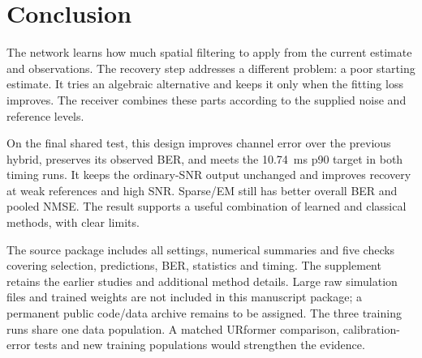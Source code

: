 \section{Conclusion}
The network learns how much spatial filtering to apply from the current estimate and observations. The recovery step addresses a different problem: a poor starting estimate. It tries an algebraic alternative and keeps it only when the fitting loss improves. The receiver combines these parts according to the supplied noise and reference levels.

On the final shared test, this design improves channel error over the previous hybrid, preserves its observed BER, and meets the 10.74~ms p90 target in both timing runs. It keeps the ordinary-SNR output unchanged and improves recovery at weak references and high SNR. Sparse/EM still has better overall BER and pooled NMSE. The result supports a useful combination of learned and classical methods, with clear limits.

The source package includes all settings, numerical summaries and five checks covering selection, predictions, BER, statistics and timing. The supplement retains the earlier studies and additional method details. Large raw simulation files and trained weights are not included in this manuscript package; a permanent public code/data archive remains to be assigned. The three training runs share one data population. A matched URformer comparison, calibration-error tests and new training populations would strengthen the evidence.
